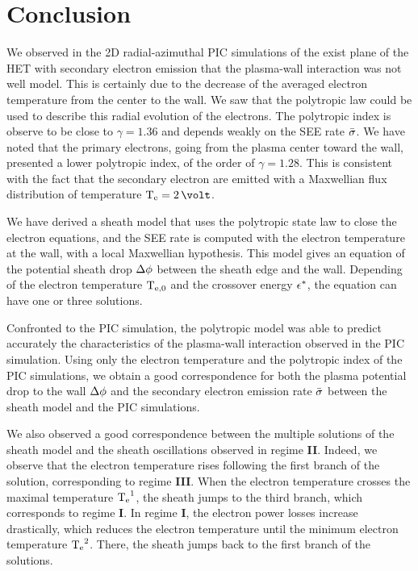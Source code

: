 

\section{Conclusion} \label{subsec-concuslion_ch4}

We observed in the \ac{2D} radial-azimuthal \ac{PIC} simulations of the exist plane of the \ac{HET} with secondary electron emission that the plasma-wall interaction was not well model.
This is certainly due to the decrease of the averaged electron temperature from the center to the wall.
We saw that the polytropic law could be used to describe this radial evolution of the electrons.
The polytropic index is observe to be close to $\gamma=1.36$ and depends weakly on the \ac{SEE} rate $ \bar{\sigma }$.
We have noted that the primary electrons, going from the plasma center toward the wall, presented a lower polytropic index, of the order of $\gamma=1.28$.
This is consistent with the fact that the secondary electron are emitted with a Maxwellian flux distribution of temperature $\Te=2\,\volt$.

We have derived a sheath model that uses the polytropic state law to close the electron equations, and the \ac{SEE} rate is computed with the electron temperature at the wall, with a local Maxwellian hypothesis.
This model gives an equation of the potential sheath drop $\Delta \phi$ between the sheath edge and the wall.
Depending of the electron temperature $\mathrm{T_{e, 0}}$ and the crossover energy $\epsilon^{*}$, the equation can have one or three solutions.

Confronted to the \ac{PIC} simulation, the polytropic model was able to predict accurately the characteristics of the plasma-wall interaction observed in the \ac{PIC} simulation.
Using only the electron temperature and the polytropic index of the \ac{PIC} simulations, we obtain a good correspondence for both the plasma potential drop to the wall $\Delta \phi$ and the secondary electron emission rate $ \bar{\sigma }$ between the sheath model and the \ac{PIC} simulations.

We also observed a good correspondence between the multiple solutions of the sheath model and the sheath oscillations observed in regime {\bf II}.
Indeed, we observe that the electron temperature rises following the first branch of the solution, corresponding to regime {\bf III}.
When the electron temperature crosses the maximal temperature $\mathrm{T_e}^1$, the sheath jumps to the third branch, which corresponds to regime {\bf I}.
In regime {\bf I}, the electron power losses increase drastically, which reduces the electron temperature until the minimum electron temperature $\mathrm{T_e}^2$.
There, the sheath jumps back to the first branch of the solutions.


